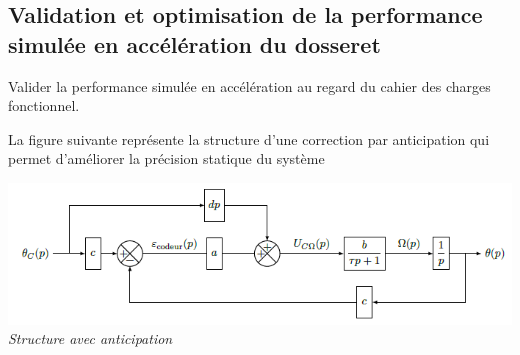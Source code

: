 \documentclass[10pt,fleqn]{article} %
\begin{document}
\begin{multicols}{2}
\subsection*{Validation et optimisation de la performance simulée en
accélération du dosseret}

\begin{obj}
Valider la performance simulée en accélération au regard du cahier des
charges fonctionnel.
\end{obj}
%
%


%
%  
%  


La figure suivante représente la structure d'une correction par anticipation
qui permet d'améliorer la précision statique du système

\begin{center}
\includegraphics[width=1.0\linewidth]{images/image17.png}
\textit{Structure avec anticipation \label{fig16}}
\end{center}


\end{multicols}
\end{document}
